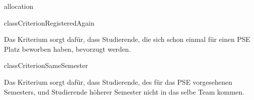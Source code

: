 \begin{texdocpackage}{allocation}
\begin{texdocclass}{class}{CriterionRegisteredAgain}
\label{texdoclet:allocation.CriterionRegisteredAgain}
\begin{texdocclassintro}
Das Kriterium sorgt dafür, dass Studierende, die sich schon einmal für einen
 PSE Platz beworben haben, bevorzugt werden.\end{texdocclassintro}
\begin{texdocclassconstructors}
\end{texdocclassconstructors}
\begin{texdocclassmethods}
\end{texdocclassmethods}
\end{texdocclass}


\begin{texdocclass}{class}{CriterionSameSemester}
\label{texdoclet:allocation.CriterionSameSemester}
\begin{texdocclassintro}
Das Kriterium sorgt dafür, dass Studierende, des für das PSE vorgesehenen
 Semesters, und Studierende höherer Semester nicht in das selbe Team kommen.\end{texdocclassintro}
\begin{texdocclassconstructors}
\end{texdocclassconstructors}
\begin{texdocclassmethods}
\end{texdocclassmethods}
\end{texdocclass}



\end{texdocpackage}
